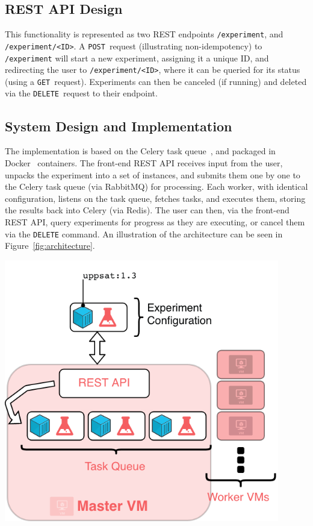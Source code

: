 \documentclass[a4paper]{IEEEtran}
\begin{document}
\subsection{REST API Design}

This functionality is represented as two REST endpoints \texttt{/experiment},
and \texttt{/experiment/<ID>}. A \texttt{POST}~request (illustrating
non-idempotency) to \texttt{/experiment} will start a new experiment, assigning
it a unique ID, and redirecting the user to \texttt{/experiment/<ID>}, where it
can be queried for its status (using a \texttt{GET}~request). Experiments can
then be canceled (if running) and deleted via the \texttt{DELETE}~request to
their endpoint.

\subsection{System Design and Implementation}

The implementation is based on the Celery task queue~\cite{celery}, and packaged
in Docker~\cite{docker} containers. The front-end REST API receives input from
the user, unpacks the experiment into a set of instances, and submits them one
by one to the Celery task queue (via RabbitMQ) for processing. Each worker, with
identical configuration, listens on the task queue, fetches tasks, and executes
them, storing the results back into Celery (via Redis). The user can then, via
the front-end REST API, query experiments for progress as they are executing, or
cancel them via the \texttt{DELETE} command. An illustration of the architecture
can be seen in Figure~\ref{fig:architecture}.

\begin{Figure}
  \centering
  \includegraphics[width=0.9\textwidth]{architecture}
  \label{fig:architecture}
\end{Figure}
\end{document}
